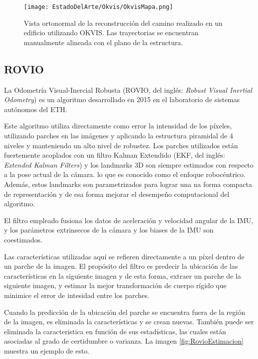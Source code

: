 {\begin{figure}[H]
	\centering
	\texttt{[image: EstadoDelArte/Okvis/OkvisMapa.png]}
	\caption[Vista ortonormal de la reconstrucción del camino realizado en un edificio utilizando OKVIS]{Vista ortonormal de la reconstrucción del camino realizado en un edificio utilizando OKVIS. Las trayectorias se encuentran manualmente alineada con el plano de la estructura.}
	\label{fig:RovioEstimacionMapa}
\end{figure}


\subsection{ROVIO}

La Odometría Visual-Inercial Robusta (ROVIO, del inglés: \textit{Robust Visual Inertial Odometry}) es un algoritmo desarrollado en 2015 en el laboratorio de sistemas autónomos del ETH.

Este algoritmo utiliza directamente como error la intensidad de los píxeles, utilizando parches en las  imágenes y aplicando la estructura piramidal de 4 niveles y manteniendo un alto nivel de robustez. Los parches utilizados están fuertemente acoplados con un filtro Kalman Extendido (EKF, del inglés: \textit{Extended Kalman Filters}) y los landmarks 3D son siempre estimados con respecto a la pose actual de la cámara. lo que es conocido como el enfoque robocéntrico. Además, estos landmarks son parametrizados para lograr una na forma compacta de representación y de esa forma mejorar el desempeño computacional del algoritmo. 

El filtro empleado fusiona los datos de aceleración y velocidad angular de la IMU, y los parámetros extrinsecos de la cámara y los biases de la IMU son coestimados. 

Las características utilizadas aquí se refieren directamente a un píxel dentro de un parche de la imagen. El propósito del filtro es predecir la ubicación de las características en la siguiente imagen y de esta forma, extraer un parche de la siguiente imagen, y estimar la mejor transformación de cuerpo rígido que minimice el error de intesidad entre los parches. 

Cuando la predicción de la ubicación del parche se encuentra fuera de la región de la imagen, es eliminada la características y se crean nuevas. También puede ser eliminada la caracteristica en función de sus estadísticas, las cuales están asociadas al grado de certidumbre o varianza. La imagen \ref{fig:RovioEstimacion} muestra un ejemplo de esto.

}
